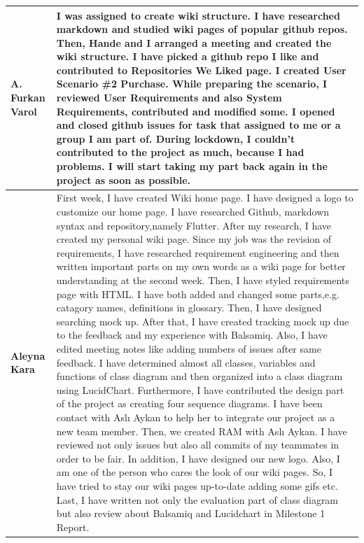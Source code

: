 \documentclass[]{article}
\begin{document}
\begin{table}[H]
{\begin{tabulary}{1.3\textwidth}{LL}
            \textbf{A. Furkan Varol}       & I was assigned to create wiki structure. I have researched markdown and studied wiki pages of popular github repos. Then, Hande and I arranged a meeting and created the wiki structure. I have picked a github repo I like and contributed to Repositories We Liked page. I created User Scenario \#2 Purchase. While preparing the scenario, I reviewed User Requirements and also System Requirements, contributed and modified some. I opened and closed github issues for task that assigned to me or a group I am part of. During lockdown, I couldn't contributed to the project as much, because I had problems. I will start taking my part back again in the project as soon as possible.                                                                                                                                                                                                                                                                                                                                                                                                                                                                                                                                                                                                                                                                                                                                                                                                                                                                                                                    \\ \midrule
            \textbf{Aleyna Kara }          & First week, I have created Wiki home page. I have designed a logo to customize our home page. I have researched Github, markdown syntax and repository,namely Flutter. After my research, I have created my personal wiki page. Since my job was the revision of requirements, I have researched requirement engineering and then written important parts on my own words as a wiki page for better understanding at the second week. Then, I have styled requirements page with HTML. I have both added and changed some parts,e.g. catagory names, definitions in glossary. Then, I have designed searching mock up. After that, I have created tracking mock up due to the feedback and my experience with Balsamiq. Also, I have edited meeting notes like adding numbers of issues after same feedback. I have determined almost all classes, variables and functions of class diagram and then organized into a class diagram using LucidChart. Furthermore, I have contributed the design part of the project as creating four sequence diagrams. I have been contact with Aslı Aykan to help her to integrate our project as a new team member. Then, we created RAM with Aslı Aykan. I have reviewed not only issues but also all commits of my teammates in order to be fair. In addition, I have designed our new logo. Also, I am one of the person who cares the look of our wiki pages. So, I have tried to stay our wiki pages up-to-date adding some gifs etc. Last, I have written not only the evaluation part of class diagram but also review about Balsamiq and Lucidchart in Milestone 1 Report. \\ \midrule

\end{tabulary}}
\end{table}
\end{document}
